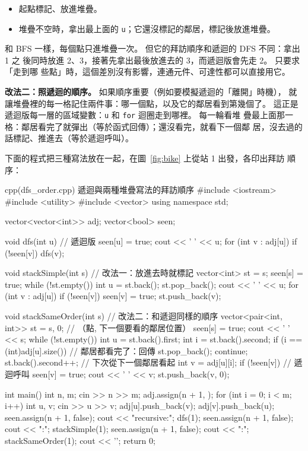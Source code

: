 \begin{itemize}
\item 起點標記、放進堆疊。
\item 堆疊不空時，拿出最上面的 \texttt{u}；它還沒標記的鄰居，標記後放進堆疊。
\end{itemize}

和 BFS 一樣，每個點只進堆疊一次。 但它的拜訪順序和遞迴的 DFS 不同：拿出 1 之
後同時放進 2、3，接著先拿出最後放進去的 3，而遞迴版會先走 2。 只要求「走到哪
些點」時，這個差別沒有影響，連通元件、可達性都可以直接用它。

\textbf{改法二：照遞迴的順序。} 如果順序重要（例如要模擬遞迴的「離開」時機），
就讓堆疊裡的每一格記住兩件事：哪一個點，以及它的鄰居看到第幾個了。 這正是
遞迴版每一層的區域變數：\texttt{u} 和 \texttt{for} 迴圈走到哪裡。 每一輪看堆
疊最上面那一格：鄰居看完了就彈出（等於函式回傳）；還沒看完，就看下一個鄰
居，沒去過的話標記、推進去（等於遞迴呼叫）。

下面的程式把三種寫法放在一起，在圖~\ref{fig:bike} 上從站 1 出發，各印出拜訪
順序：

\begin{example}[label=ex:dfs-order]{cpp}{(dfs\_order.cpp) 遞迴與兩種堆疊寫法的拜訪順序}
#include <iostream>
#include <utility>
#include <vector>
using namespace std;

vector<vector<int>> adj;
vector<bool> seen;

void dfs(int u) {                            // 遞迴版
    seen[u] = true;
    cout << ' ' << u;
    for (int v : adj[u]) {
        if (!seen[v]) {
            dfs(v);
        }
    }
}

void stackSimple(int s) {                    // 改法一：放進去時就標記
    vector<int> st = {s};
    seen[s] = true;
    while (!st.empty()) {
        int u = st.back();
        st.pop_back();
        cout << ' ' << u;
        for (int v : adj[u]) {
            if (!seen[v]) {
                seen[v] = true;
                st.push_back(v);
            }
        }
    }
}

void stackSameOrder(int s) {                 // 改法二：和遞迴同樣的順序
    vector<pair<int, int>> st = {{s, 0}};    // （點, 下一個要看的鄰居位置）
    seen[s] = true;
    cout << ' ' << s;
    while (!st.empty()) {
        int u = st.back().first;
        int i = st.back().second;
        if (i == (int)adj[u].size()) {       // 鄰居都看完了：回傳
            st.pop_back();
            continue;
        }
        st.back().second++;                  // 下次從下一個鄰居看起
        int v = adj[u][i];
        if (!seen[v]) {                      // 遞迴呼叫
            seen[v] = true;
            cout << ' ' << v;
            st.push_back({v, 0});
        }
    }
}

int main() {
    int n, m;
    cin >> n >> m;
    adj.assign(n + 1, {});
    for (int i = 0; i < m; i++) {
        int u, v;
        cin >> u >> v;
        adj[u].push_back(v);
        adj[v].push_back(u);
    }
    seen.assign(n + 1, false);
    cout << "recursive:";
    dfs(1);
    seen.assign(n + 1, false);
    cout << "\nsimple:";
    stackSimple(1);
    seen.assign(n + 1, false);
    cout << "\nsame:";
    stackSameOrder(1);
    cout << '\n';
    return 0;
}
\end{example}

